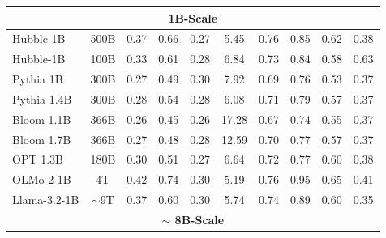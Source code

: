 \documentclass{article} %
\begin{document}
\begin{table}[h]
\begin{tabular}{lccccccccc}
\midrule
\multicolumn{10}{c}{{\textbf{1B-Scale}}} \\
\midrule
{Hubble-1B} & %
  {500B} &
  {0.37} &
  {0.66} &
  {0.27} &
  {5.45} &
  {0.76} &
  {0.85} &
  {0.62} &
  {0.38} \\
{Hubble-1B} & %
  {100B} &
  {0.33} &
  {0.61} &
  {0.28} &
  {6.84} &
  {0.73} &
  {0.84} &
  {0.58} &
  {0.63} \\
{Pythia 1B} &
  {300B} &
  {0.27} &
  {0.49} &
  {0.30} &
  {7.92} &
  {0.69} &
  {0.76} &
  {0.53} &
  {0.37} \\
{Pythia 1.4B} &
  {300B} &
  {0.28} &
  {0.54} &
  {0.28} &
  {6.08} &
  {0.71} &
  {0.79} &
  {0.57} &
  {0.37} \\
{Bloom 1.1B} &
  {366B} &
  {0.26} &
  {0.45} &
  {0.26} &
  {17.28} &
  {0.67} &
  {0.74} &
  {0.55} &
  {0.37} \\
{Bloom 1.7B} &
  {366B} &
  {0.27} &
  {0.48} &
  {0.28} &
  {12.59} &
  {0.70} &
  {0.77} &
  {0.57} &
  {0.37} \\
{OPT 1.3B} &
  {180B} &
  {0.30} &
  {0.51} &
  {0.27} &
  {6.64} &
  {0.72} &
  {0.77} &
  {0.60} &
  {0.38} \\
{OLMo-2-1B} &
  {4T} &
  {0.42} &
  {0.74} &
  {0.30} &
  {5.19} &
  {0.76} &
  {0.95} &
  {0.65} &
  {0.41} \\ 
{Llama-3.2-1B} &
  {$\sim$9T} &
  {0.37} &
  {0.60} &
  {0.30} &
  {5.74} &
  {0.74} &
  {0.89} &
  {0.60} &
  {0.35} \\  

\midrule
\multicolumn{10}{c}{{\textbf{$\sim$ 8B-Scale}}} \\ \midrule


\end{tabular}
\end{table}
\end{document}
